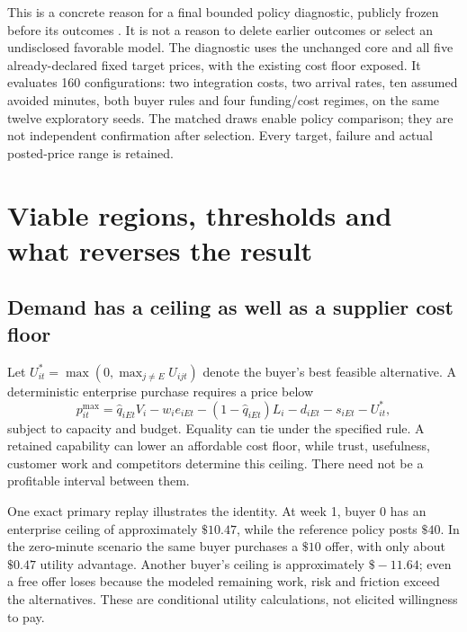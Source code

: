 \documentclass[11pt,a4paper]{article}
\newcommand{\money}[1]{\(\$#1\)}
\begin{document}
This is a concrete reason for a final bounded policy diagnostic, publicly frozen before its outcomes \cite{policyfreeze}. It is not a reason to delete
earlier outcomes or select an undisclosed favorable model. The diagnostic uses the unchanged
core and all five already-declared fixed target prices, with the existing cost floor exposed.
It evaluates 160 configurations: two integration costs, two arrival rates, ten assumed avoided
minutes, both buyer rules and four funding/cost regimes, on the same twelve exploratory seeds.
The matched draws enable policy comparison; they are not independent confirmation after selection.
Every target, failure and actual posted-price range is retained.



\section{Viable regions, thresholds and what reverses the result}
\subsection{Demand has a ceiling as well as a supplier cost floor}
Let \(U^*_{it}=\max(0,\max_{j\ne E} U_{ijt})\) denote the buyer's best feasible alternative.
A deterministic enterprise purchase requires a price below
\begin{equation}
p^{\max}_{it}=\hat q_{iEt}V_i-w_i e_{iEt}
 -(1-\hat q_{iEt})L_i-d_{iEt}-s_{iEt}-U^*_{it},
\label{eq:ceiling}
\end{equation}
subject to capacity and budget. Equality can tie under the specified rule.
A retained capability can lower an affordable cost floor, while trust, usefulness, customer work
and competitors determine this ceiling. There need not be a profitable interval between them.

One exact primary replay illustrates the identity. At week 1, buyer 0 has an enterprise ceiling
of approximately \money{10.47}, while the reference policy posts \money{40}. In the zero-minute
scenario the same buyer purchases a \money{10} offer, with only about \money{0.47} utility
advantage. Another buyer's ceiling is approximately \money{-11.64}; even a free offer loses
because the modeled remaining work, risk and friction exceed the alternatives.
These are conditional utility calculations, not elicited willingness to pay.
\end{document}

